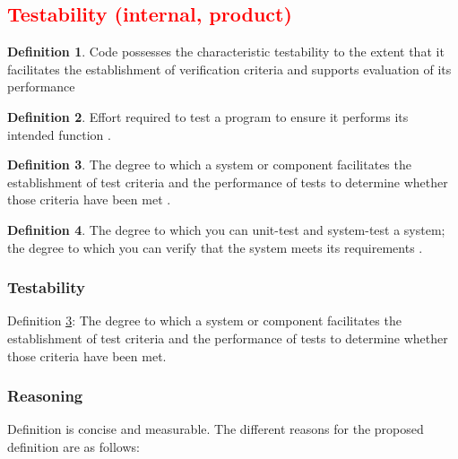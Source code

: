 \documentclass[letterpaper, cleveref]{lipics-v2019}
\newcommand{\authornote}[3]{\textcolor{#1}{[#3 ---#2]}}
\newcommand{\authornote}[3]{}
\newcommand{\oo}[1]{\authornote{magenta}{OO}{#1}} %
\newcommand{\notdone}[1]{\textcolor{red}{#1}}
\theoremstyle{definition}
\newtheorem{defn}{Definition}
\begin{document}

\subsection{\notdone{Testability (internal, product)}} %

\begin{defn}
	Code possesses the characteristic testability to the extent that it
  facilitates the establishment of verification criteria and supports
  evaluation of its performance \citep{boehm1976quantitative}
\end{defn}

\begin{defn}
	Effort required to test a program to ensure it performs
	its intended function \citep{McCallEtAl1977}.
\end{defn}

\begin{defn} \label{Defn_Testability}
	 The degree to which a system or component facilitates the establishment of
	 test criteria and the performance of tests to determine whether those
	 criteria have been met \citep{IEEEStdGlossarySET1990}.
\end{defn}

\begin{defn}
	The degree to which you can unit-test and system-test a system; the degree
  to which you can verify that the system meets its requirements
  \citep{mcconnell2004code}.
\end{defn}

\begin{mybox}
\subsubsection*{Testability}
Definition \ref{Defn_Testability}: The degree to which a system or component
 facilitates the establishment of test criteria and the performance of tests
 to determine whether those criteria have been met.
\end{mybox}

\subsubsection*{Reasoning}

Definition is concise and measurable.   The different reasons for the proposed
definition are as follows:
\end{document}

